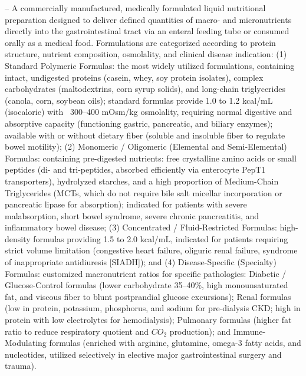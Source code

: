 -- A commercially manufactured, medically formulated liquid nutritional preparation designed to deliver defined quantities of macro- and micronutrients directly into the gastrointestinal tract via an enteral feeding tube or consumed orally as a medical food. Formulations are categorized according to protein structure, nutrient composition, osmolality, and clinical disease indication: (1) Standard Polymeric Formulas: the most widely utilized formulations, containing intact, undigested proteins (casein, whey, soy protein isolates), complex carbohydrates (maltodextrins, corn syrup solids), and long-chain triglycerides (canola, corn, soybean oils); standard formulas provide 1.0 to 1.2 kcal/mL (isocaloric) with ~300--400 mOsm/kg osmolality, requiring normal digestive and absorptive capacity (functioning gastric, pancreatic, and biliary enzymes); available with or without dietary fiber (soluble and insoluble fiber to regulate bowel motility); (2) Monomeric / Oligomeric (Elemental and Semi-Elemental) Formulas: containing pre-digested nutrients: free crystalline amino acids or small peptides (di- and tri-peptides, absorbed efficiently via enterocyte PepT1 transporters), hydrolyzed starches, and a high proportion of Medium-Chain Triglycerides (MCTs, which do not require bile salt micellar incorporation or pancreatic lipase for absorption); indicated for patients with severe malabsorption, short bowel syndrome, severe chronic pancreatitis, and inflammatory bowel disease; (3) Concentrated / Fluid-Restricted Formulas: high-density formulas providing 1.5 to 2.0 kcal/mL, indicated for patients requiring strict volume limitation (congestive heart failure, oliguric renal failure, syndrome of inappropriate antidiuresis [SIADH]); and (4) Disease-Specific (Specialty) Formulas: customized macronutrient ratios for specific pathologies: Diabetic / Glucose-Control formulas (lower carbohydrate 35--40\%, high monounsaturated fat, and viscous fiber to blunt postprandial glucose excursions); Renal formulas (low in protein, potassium, phosphorus, and sodium for pre-dialysis CKD; high in protein with low electrolytes for hemodialysis); Pulmonary formulas (higher fat ratio to reduce respiratory quotient and $CO_2$ production); and Immune-Modulating formulas (enriched with arginine, glutamine, omega-3 fatty acids, and nucleotides, utilized selectively in elective major gastrointestinal surgery and trauma).

